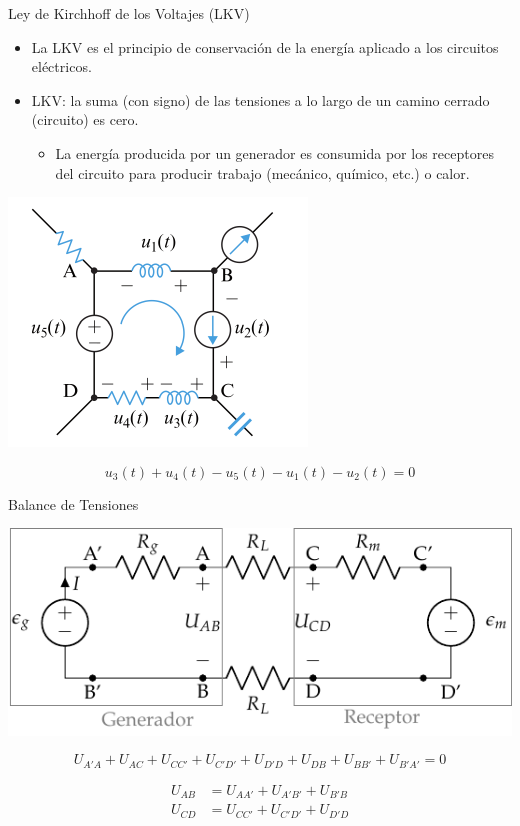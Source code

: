 \documentclass[aspectratio=169, usenames,svgnames,dvipsnames]{beamer}
\begin{document}
\begin{frame}[label={sec:orge13a778}]{Ley de Kirchhoff de los Voltajes (LKV)}
\begin{itemize}
\item La \alert{LKV} es el principio de conservación de la energía aplicado a los circuitos eléctricos.

\item \alert{LKV}: la suma (con signo) de las tensiones a lo largo de un camino cerrado (circuito) es cero.

\begin{itemize}
\item La energía producida por un generador es consumida por los receptores del circuito para producir trabajo (mecánico, químico, etc.) o calor.
\end{itemize}
\end{itemize}

\begin{center}
\includegraphics[height=0.4\textheight]{../figs/LKV_FM.pdf}
\end{center}
\[
u_3(t) + u_4 (t) - u_5 (t) - u_1 (t) - u_2 (t)  = 0
\]
\end{frame}
\begin{frame}[label={sec:orgb9af985}]{Balance de Tensiones}
\begin{center}
\includegraphics[height=0.5\textheight]{../figs/circuito_lkv.pdf}
\end{center}

\begin{equation*}
  U_{A'A} + U_{AC} + U_{CC'} + U_{C'D'} + U_{D'D} + U_{DB} + U_{BB'} + U_{B'A'} = 0
\end{equation*}

\begin{align*}
  U_{AB} &= U_{AA'} + U_{A'B'} + U_{B'B}\\
  U_{CD} &= U_{CC'} + U_{C'D'} + U_{D'D}
\end{align*}
\end{frame}
\end{document}
